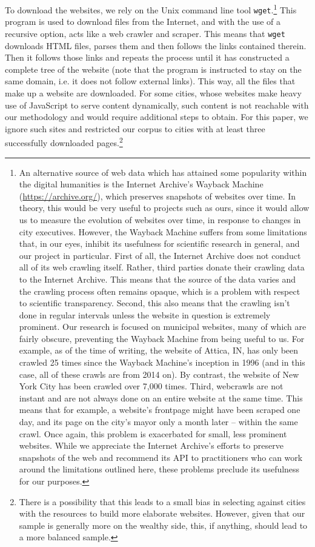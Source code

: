 \documentclass[11pt]{article}
\begin{document}
To download the websites, we rely on the Unix command line tool \texttt{wget}.\footnote{An alternative source of web data which has attained some popularity within the digital humanities is the Internet Archive's Wayback Machine (\url{https://archive.org/}), which preserves snapshots of websites over time. In theory, this would be very useful to projects such as ours, since it would allow us to measure the evolution of websites over time, in response to changes in city executives. However, the Wayback Machine suffers from some limitations that, in our eyes, inhibit its usefulness for scientific research in general, and our project in particular. First of all, the Internet Archive does not conduct all of its web crawling itself. Rather, third parties donate their crawling data to the Internet Archive. This means that the source of the data varies and the crawling process often remains opaque, which is a problem with respect to scientific transparency. Second, this also means that the crawling isn’t done in regular intervals unless the website in question is extremely prominent. Our research is focused on municipal websites, many of which are fairly obscure, preventing the Wayback Machine from being useful to us. For example, as of the time of writing, the website of Attica, IN, has only been crawled 25 times since the Wayback Machine's inception in 1996 (and in this case, all of these crawls are from 2014 on). By contrast, the website of New York City has been crawled over 7,000 times. Third, webcrawls are not instant and are not always done on an entire website at the same time. This means that for example, a website's frontpage might have been scraped one day, and its page on the city's mayor only a month later -- within the same crawl. Once again, this problem is exacerbated for small, less prominent websites. While we appreciate the Internet Archive's efforts to preserve snapshots of the web and recommend its API to practitioners who can work around the limitations outlined here, these problems preclude its usefulness for our purposes.} This program is used to download files from the Internet, and with the use of a recursive option, acts like a web crawler and scraper. This means that \texttt{wget} downloads HTML files, parses them and then follows the links contained therein. Then it follows those links and repeats the process until it has constructed a complete tree of the website (note that the program is instructed to stay on the same domain, i.e. it does not follow external links). This way, all the files that make up a website are downloaded. For some cities, whose websites make heavy use of JavaScript to serve content dynamically, such content is not reachable with our methodology and would require additional steps to obtain. For this paper, we ignore such sites and restricted our corpus to cities with at least three successfully downloaded pages.\footnote{There is a possibility that this leads to a small bias in selecting against cities with the resources to build more elaborate websites. However, given that our sample is generally more on the wealthy side, this, if anything, should lead to a more balanced sample.}
\end{document}
